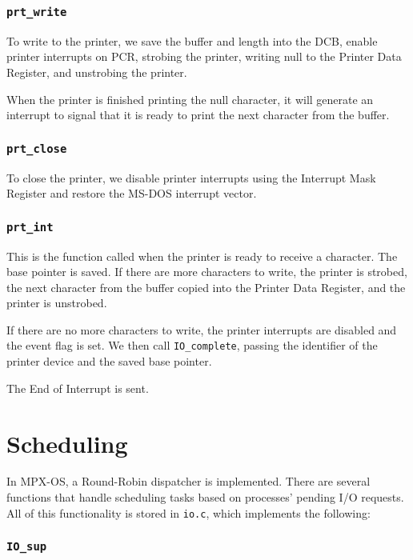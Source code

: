 \subsubsection{\tt prt\_write}

To write to the printer, we save the buffer and length into the DCB, enable printer interrupts on PCR, strobing the printer, writing null to the Printer Data Register, and unstrobing the printer.

When the printer is finished printing the null character, it will generate an interrupt to signal that it is ready to print the next character from the buffer.

\subsubsection{\tt prt\_close}

To close the printer, we disable printer interrupts using the Interrupt Mask Register and restore the MS-DOS interrupt vector.

\subsubsection{\tt prt\_int}

This is the function called when the printer is ready to receive a character. The base pointer is saved. If there are more characters to write, the printer is strobed, the next character from the buffer copied into the Printer Data Register, and the printer is unstrobed.

If there are no more characters to write, the printer interrupts are disabled and the event flag is set. We then call {\tt IO\_complete}, passing the identifier of the printer device and the saved base pointer.

The End of Interrupt is sent.


\section{Scheduling}

In MPX-OS, a Round-Robin dispatcher is implemented. There are several functions that handle scheduling tasks based on processes' pending I/O requests. All of this functionality is stored in {\tt io.c}, which implements the following:

\subsubsection{\tt IO\_sup}

